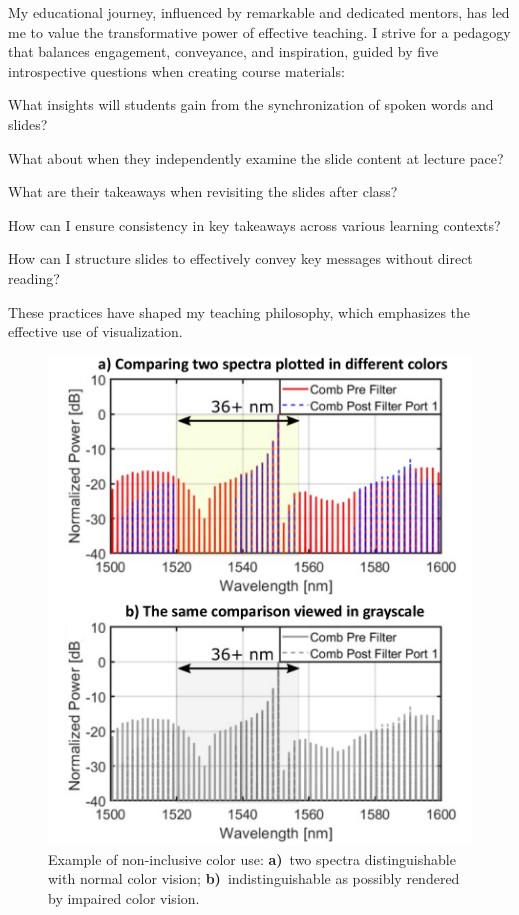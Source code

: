 My educational journey, influenced by remarkable and dedicated mentors, has led me to value the transformative power of effective teaching. I strive for a pedagogy that balances engagement, conveyance, and inspiration, guided by five introspective questions when creating course materials:
\begin{enumerate*}[label=\arabic*)]
    \item What insights will students gain from the synchronization of spoken words and slides?
    \item What about when they independently examine the slide content at lecture pace?
    \item What are their takeaways when revisiting the slides after class?
    \item How can I ensure consistency in key takeaways across various learning contexts?
    \item How can I structure slides to effectively convey key messages without direct reading?
\end{enumerate*}
These practices have shaped my teaching philosophy, which emphasizes the effective use of visualization.

\begin{figure}%
    \centering
    \includegraphics[width=\linewidth]{../../fig/color_vertical.pdf}
    \caption{Example of non-inclusive color use: \textbf{a)}~two spectra distinguishable with normal color vision; \textbf{b)}~indistinguishable as possibly rendered by impaired color vision.}
    \label{fig:color}
\end{figure}

